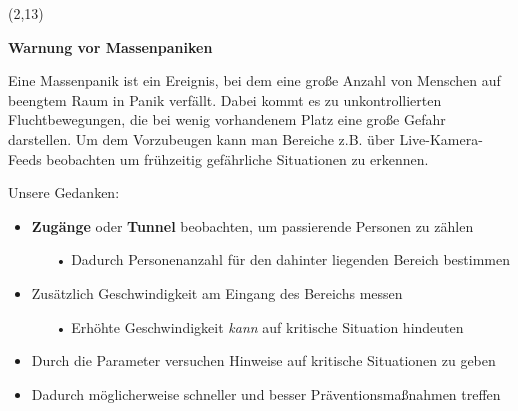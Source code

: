 \documentclass[%
textcolor=HDA_lightblue,	%
pagecolor=radacc_darkblue,		%
]{../estposter}
\begin{document}
\begin{textblock}{12.5}(2,13)

\color{HDA_gray_0}
\textbf{Warnung vor Massenpaniken}
\par\smallskip

\color{HDA_lightblue}
Eine Massenpanik ist ein Ereignis, bei dem eine große Anzahl von Menschen auf beengtem Raum in Panik verfällt. Dabei kommt es zu unkontrollierten Fluchtbewegungen, die bei wenig vorhandenem Platz eine große Gefahr darstellen. Um dem Vorzubeugen kann man Bereiche z.B. über Live-Kamera-Feeds beobachten um frühzeitig gefährliche Situationen zu erkennen. 

\par\smallskip

Unsere Gedanken:
\begin{itemize}[leftmargin=10pt, rightmargin=10pt, topsep=3pt,itemsep=1pt,partopsep=1pt, parsep=1pt]
\item \textbf{Zugänge} oder \textbf{Tunnel} beobachten, um passierende Personen zu zählen
		
	 	\begin{itemize}
			\item[•] Dadurch Personenanzahl für den dahinter liegenden Bereich bestimmen
		\end{itemize}
	
\item Zusätzlich Geschwindigkeit am Eingang des Bereichs messen
		
	 	\begin{itemize}
			\item[•] Erhöhte Geschwindigkeit \emph{kann} auf kritische Situation hindeuten
		\end{itemize}
		
\item Durch die Parameter versuchen Hinweise auf kritische Situationen zu geben
\item Dadurch möglicherweise schneller und besser Präventionsmaßnahmen treffen		
\end{itemize}




\par\bigskip
\par\bigskip
\par\bigskip
\par\bigskip
\par\bigskip
\par\bigskip
\par\bigskip
\par\bigskip
\par\bigskip
\par\bigskip
\par\bigskip



\end{textblock}
\end{document}
